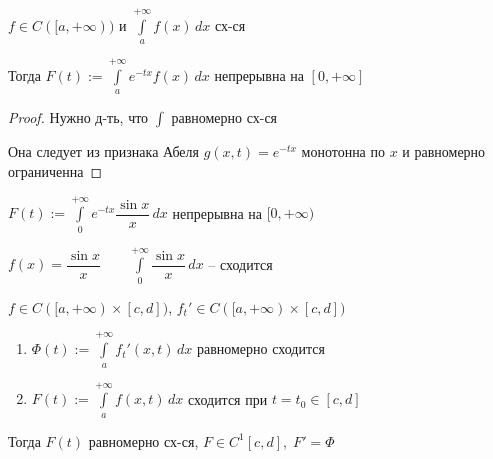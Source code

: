 
\begin{theorem}\thmslashn
	
	$f \in C([a, +\infty))$ и $ \int\limits_{a}^{+\infty} f(x)\,dx $ сх-ся
	
	Тогда $F(t) :=  \int\limits_{a}^{+\infty} e^{-tx}f(x)\,dx $ непрерывна на $[0, +\infty]$
	
\end{theorem}

\begin{proof}\thmslashn
	
	Нужно д-ть, что $\int$ равномерно сх-ся 
	
	Она следует из признака Абеля $g(x, t) = e^{-tx}$ монотонна по $x$ и равномерно ограниченна 

\end{proof}

\begin{example} \thmslashn
	
	$F(t) :=  \int\limits_{0}^{+\infty} e^{-tx} \dfrac{\sin x}{x}\,dx$ непрерывна на $[0, +\infty)$
	
	$f(x) = \dfrac{\sin x}{x} \qquad \int\limits_{0}^{+\infty} \dfrac{\sin x}{x}\,dx$ -- сходится
		
\end{example}

\begin{theorem}\thmslashn
	
	$f \in C([a, +\infty) \times [c, d])$, $f_t' \in C([a, +\infty) \times [c, d])$
	\begin{enumerate}
		\item 
		$\Phi(t) := \int\limits_{a}^{+\infty} f_t'(x, t)\,dx$ равномерно сходится
		\item 
		$F(t) := \int\limits_{a}^{+\infty} f(x, t)\,dx$ сходится при $t = t_0 \in [c, d]$
	\end{enumerate}
	 	
	Тогда $F(t)$ равномерно сх-ся, $F \in C^1[c, d],\; F' = \Phi$
	
\end{theorem}

